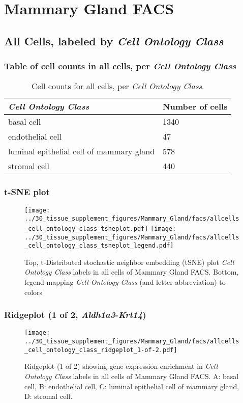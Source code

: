 \clearpage
\section{Mammary Gland FACS}

\subsection{All Cells, labeled by \emph{Cell Ontology Class}}
\subsubsection{Table of cell counts in all cells, per \emph{Cell Ontology Class}}\begin{table}[h]
\centering
\label{my-label}
\begin{tabular}{@{}ll@{}}
\toprule

\emph{Cell Ontology Class}& Number of cells \\ \midrule
basal cell & 1340 \\

endothelial cell & 47 \\

luminal epithelial cell of mammary gland & 578 \\

stromal cell & 440 \\
\bottomrule
\end{tabular}
\caption{Cell counts for all cells, per \emph{Cell Ontology Class}.}
\end{table}

\clearpage
\subsubsection{t-SNE plot}
\begin{figure}[h]
\centering
\texttt{[image: ../30\_tissue\_supplement\_figures/Mammary\_Gland/facs/allcells\_cell\_ontology\_class\_tsneplot.pdf]}
\texttt{[image: ../30\_tissue\_supplement\_figures/Mammary\_Gland/facs/allcells\_cell\_ontology\_class\_tsneplot\_legend.pdf]}
\caption{Top, t-Distributed stochastic neighbor embedding (tSNE) plot  \emph{Cell Ontology Class} labels in all cells of Mammary Gland FACS. Bottom, legend mapping \emph{Cell Ontology Class} (and letter abbreviation) to colors}
\end{figure}


\clearpage

\subsubsection{Ridgeplot (1 of 2, \emph{Aldh1a3}-\emph{Krt14})}
\begin{figure}[h]
\centering
\texttt{[image: ../30\_tissue\_supplement\_figures/Mammary\_Gland/facs/allcells\_cell\_ontology\_class\_ridgeplot\_1-of-2.pdf]}

\caption{ Ridgeplot (1 of 2)  showing gene expression enrichment in \emph{Cell Ontology Class} labels in all cells of Mammary Gland FACS. A: basal cell, B: endothelial cell, C: luminal epithelial cell of mammary gland, D: stromal cell.}
\end{figure}


